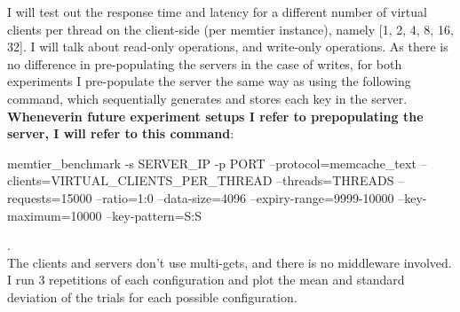 \documentclass[11pt,a4paper]{article}
\begin{document}
I will test out the response time and latency for a different number of virtual clients per thread on the client-side (per memtier instance), namely [1, 2, 4, 8, 16, 32].
I will talk about read-only operations, and write-only operations.
As there is no difference in pre-populating the servers in the case of writes, for both experiments I pre-populate the server the same way as using the following command, which sequentially generates and stores each key in the server.
\textbf{Wheneverin future experiment setups  I refer to prepopulating the server, I will refer to this command}:

\begin{spverbatim}
      memtier_benchmark -s {SERVER_IP} -p {PORT}
      --protocol=memcache_text --clients={VIRTUAL_CLIENTS_PER_THREAD} --threads={THREADS}
      --requests=15000 --ratio=1:0 --data-size=4096
     --expiry-range=9999-10000 --key-maximum=10000 --key-pattern=S:S
\end{spverbatim}
.\\
The clients and servers don't use multi-gets, and there is no middleware involved.
I run 3 repetitions of each configuration and plot the mean and standard deviation of the trials for each possible configuration. \\
\end{document}
